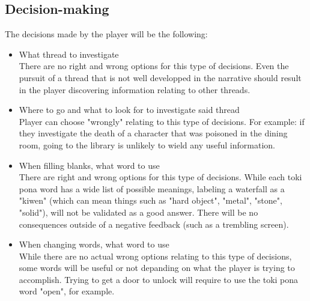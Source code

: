 \documentclass{scrartcl}
\begin{document}
		\subsection{Decision-making}
		The decisions made by the player will be the following:
		\begin{itemize}
			\item What thread to investigate\\
			There are no right and wrong options for this type of decisions. Even the pursuit of a thread that is not well developped in the narrative should result in the player discovering information relating to other threads.
			\item Where to go and what to look for to investigate said thread\\
			Player can choose "wrongly" relating to this type of decisions. For example: if they investigate the death of a character that was poisoned in the dining room, going to the library is unlikely to wield any useful information.
			\item When filling blanks, what word to use\\
			There are right and wrong options for this type of decisions. While each toki pona word has a wide list of possible meanings, labeling a waterfall as a "kiwen" (which can mean things such as "hard object", "metal", "stone", "solid"), will not be validated as a good answer. There will be no consequences outside of a negative feedback (such as a trembling screen).
			\item When changing words, what word to use\\
			While there are no actual wrong options relating to this type of decisions, some words will be useful or not depanding on what the player is trying to accomplish. Trying to get a door to unlock will require to use the toki pona word "open", for example.
		\end{itemize}
\end{document}
